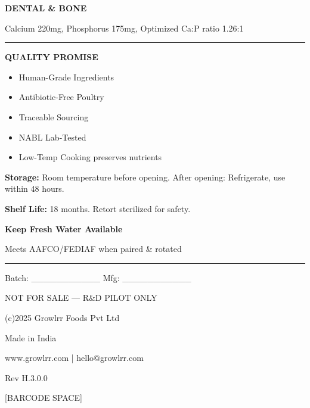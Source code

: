\documentclass[10pt,a6paper,landscape]{article}
\begin{document}
\begin{multicols}{3}
{\textbf{DENTAL \& BONE}

Calcium 220mg, Phosphorus 175mg, Optimized Ca:P ratio 1.26:1
}

\vspace{3mm}
\hrule
\vspace{1mm}

{\small\bfseries QUALITY PROMISE}

{\tiny
\begin{itemize}
\item Human-Grade Ingredients
\item Antibiotic-Free Poultry
\item Traceable Sourcing
\item NABL Lab-Tested
\item Low-Temp Cooking preserves nutrients
\end{itemize}

\textbf{Storage:} Room temperature before opening. After opening: Refrigerate, use within 48 hours.

\textbf{Shelf Life:} 18 months. Retort sterilized for safety.

\textbf{Keep Fresh Water Available}

Meets AAFCO/FEDIAF when paired \& rotated
}

\vspace{3mm}
\hrule
\vspace{1mm}

{\tiny
Batch: \_\_\_\_\_\_\_\_\_\_\_ Mfg: \_\_\_\_\_\_\_\_\_\_\_

NOT FOR SALE --- R\&D PILOT ONLY

(c)2025 Growlrr Foods Pvt Ltd

Made in India

www.growlrr.com | hello@growlrr.com

Rev H.3.0.0

[BARCODE SPACE]
}

\end{multicols}
\end{document}
